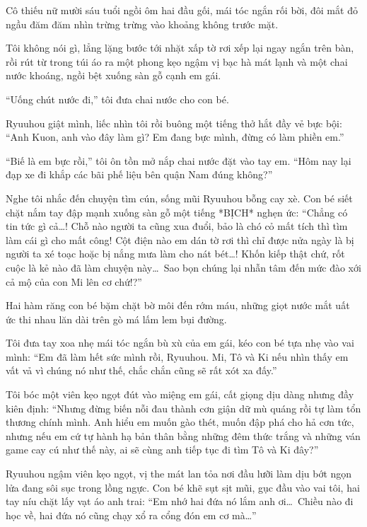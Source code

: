 \documentclass[../main.tex]{subfiles}
\begin{document}
Cô thiếu nữ mười sáu tuổi ngồi ôm hai đầu gối, mái tóc ngắn rối bời, đôi mắt đỏ ngầu đăm đăm nhìn trừng trừng vào khoảng không trước mặt.

Tôi không nói gì, lẳng lặng bước tới nhặt xấp tờ rơi xếp lại ngay ngắn trên bàn, rồi rút từ trong túi áo ra một phong kẹo ngậm vị bạc hà mát lạnh và một chai nước khoáng, ngồi bệt xuống sàn gỗ cạnh em gái.

``Uống chút nước đi,'' tôi đưa chai nước cho con bé.

Ryuuhou giật mình, liếc nhìn tôi rồi buông một tiếng thở hắt đầy vẻ bực bội: ``Anh Kuon, anh vào đây làm gì? Em đang bực mình, đừng có làm phiền em.''

``Biế là em bực rồi,'' tôi ôn tồn mở nắp chai nước đặt vào tay em. ``Hôm nay lại đạp xe đi khắp các bãi phế liệu bên quận Nam đúng không?''

Nghe tôi nhắc đến chuyện tìm cún, sống mũi Ryuuhou bỗng cay xè. Con bé siết chặt nắm tay đập mạnh xuống sàn gỗ một tiếng *BỊCH* nghẹn ức: ``Chẳng có tin tức gì cả\dots! Chỗ nào người ta cũng xua đuổi, bảo là chó cỏ mất tích thì tìm làm cái gì cho mất công! Cột điện nào em dán tờ rơi thì chỉ được nửa ngày là bị người ta xé toạc hoặc bị nắng mưa làm cho nát bét\dots! Khốn kiếp thật chứ, rốt cuộc là kẻ nào đã làm chuyện này\dots\ Sao bọn chúng lại nhẫn tâm đến mức đào xới cả mộ của con Mi lên cơ chứ!?''

Hai hàm răng con bé bặm chặt bờ môi đến rớm máu, những giọt nước mắt uất ức thi nhau lăn dài trên gò má lấm lem bụi đường.

Tôi đưa tay xoa nhẹ mái tóc ngắn bù xù của em gái, kéo con bé tựa nhẹ vào vai mình: ``Em đã làm hết sức mình rồi, Ryuuhou. Mi, Tô và Ki nếu nhìn thấy em vất vả vì chúng nó như thế, chắc chắn cũng sẽ rất xót xa đấy.''

Tôi bóc một viên kẹo ngọt đút vào miệng em gái, cất giọng dịu dàng nhưng đầy kiên định: ``Nhưng đừng biến nỗi đau thành cơn giận dữ mù quáng rồi tự làm tổn thương chính mình. Anh hiểu em muốn gào thét, muốn đập phá cho hả cơn tức, nhưng nếu em cứ tự hành hạ bản thân bằng những đêm thức trắng và những ván game cay cú như thế này, ai sẽ cùng anh tiếp tục đi tìm Tô và Ki đây?''

Ryuuhou ngậm viên kẹo ngọt, vị the mát lan tỏa nơi đầu lưỡi làm dịu bớt ngọn lửa đang sôi sục trong lồng ngực. Con bé khẽ sụt sịt mũi, gục đầu vào vai tôi, hai tay níu chặt lấy vạt áo anh trai: ``Em nhớ hai đứa nó lắm anh ơi\dots\ Chiều nào đi học về, hai đứa nó cũng chạy xổ ra cổng đón em cơ mà\dots''
\end{document}
